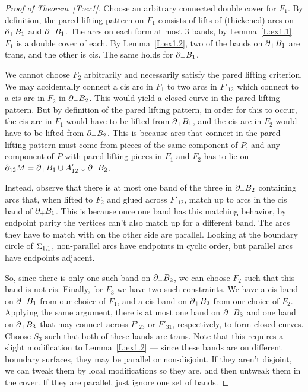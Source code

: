 \begin{proof}[Proof of Theorem~\ref{T:ex1}]
Choose an arbitrary connected double cover for $F_1$. By definition, the pared
lifting pattern on $F_1$ consists of lifts of (thickened) arcs on $\partial_+ B_1$
and $\partial_- B_1$. The arcs on each form at most 3 bands, by Lemma~\ref{L:ex1.1}.
$F_1$ is a double cover of each.  By Lemma~\ref{L:ex1.2}, two of the bands on
$\partial_+B_1$ are trans, and the other is cis. The same holds for $\partial_-B_1$.

We cannot choose $F_2$ arbitrarily and necessarily satisfy the pared lifting
criterion. We may accidentally connect a cis arc in $F_1$ to two arcs in
$F'_{12}$ which connect to a cis arc in $F_2$ in $\partial_-B_2$. This would yield
a closed curve in the pared lifting pattern. But by definition of the pared
lifting pattern, in order for this to occur, the cis arc in $F_1$ would have to
be lifted from $\partial_+ B_1$, and the cis arc in $F_2$ would have to be lifted
from $\partial_- B_2$. This is because arcs that connect in the pared lifting
pattern must come from pieces of the same component of $P$, and any component
of $P$ with pared lifting pieces in $F_1$ and $F_2$ has to lie on $\partial_{12}
M = \partial_+ B_1 \cup A'_{12} \cup \partial_- B_2$.

Instead, observe that there is at most one band of the three in $\partial_-B_2$
containing arcs that, when lifted to $F_2$ and glued across $F'_{12}$, match up
to arcs in the cis band of $\partial_+B_1$. This is because once one band has this
matching behavior, by endpoint parity the vertices can't also match up for
a different band. The arcs they have to match with on the other side are
parallel. Looking at the boundary circle of $\Sigma_{1,1}$, non-parallel arcs have
endpoints in cyclic order, but parallel arcs have endpoints adjacent.

So, since there is only one such band on $\partial_-B_2$, we can choose $F_2$ such
that this band is not cis.  Finally, for $F_3$ we have two such constraints.
We have a cis band on $\partial_-B_1$ from our choice of $F_1$, and a cis band on
$\partial_+B_2$ from our choice of $F_2$.  Applying the same argument, there is at
most one band on $\partial_-B_3$ and one band on $\partial_+B_3$ that may connect across
$F'_{23}$ or $F'_{31}$, respectively, to form closed curves. Choose $S_3$ such
that both of these bands are trans. Note that this requires a slight
modification to Lemma~\ref{L:ex1.2} --- since these bands are on different
boundary surfaces, they may be parallel or non-disjoint.  If they aren't
disjoint, we can tweak them by local modifications so they are, and then
untweak them in the cover. If they are parallel, just ignore one set of bands.


\end{proof}
